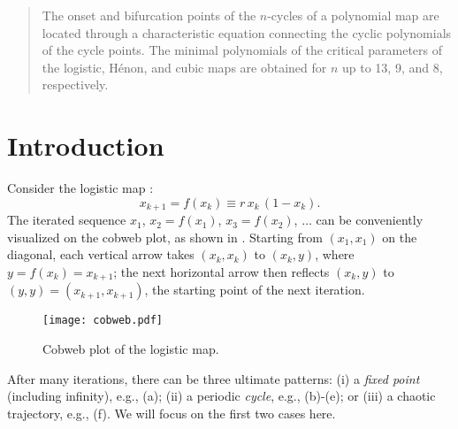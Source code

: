 \documentclass{ws-ijbc}
\begin{document}
\begin{abstract}
The onset and bifurcation points of the $n$-cycles of
  a polynomial map are located
  through a characteristic equation
  connecting the cyclic polynomials of the cycle points.
The minimal polynomials of the critical parameters
  of the logistic, H\'enon, and cubic maps are obtained
  for $n$ up to 13, 9, and 8,
  respectively.
\end{abstract}





\twocolumn



%
%
\section{Introduction}
%
%

Consider the logistic map \cite{may, strogatz}:
%
\begin{equation}
  x_{k+1} = f(x_k) \equiv r \, x_k \, ( 1 - x_k ).
\label{eq:logmap}
\end{equation}
%
The iterated sequence $x_1$,
  $x_2 = f(x_1)$,
  $x_3 = f(x_2)$, $\ldots$
can be conveniently visualized on the cobweb plot,
  as shown in .
%
Starting from $(x_1, x_1)$ on the diagonal,
  each vertical arrow takes $(x_k, x_k)$ to $(x_k, y)$,
  where $y = f(x_k) = x_{k+1}$;
the next horizontal arrow then reflects $(x_k, y)$ to
  $(y, y) = (x_{k+1}, x_{k+1})$,
  the starting point of the next iteration.
%
%
\begin{figure}[h]
  \begin{center}
  \begin{minipage}{\linewidth}
        \texttt{[image: cobweb.pdf]}
  \end{minipage}%
  \end{center}
  \caption{\label{fig:cobweb}
  Cobweb plot of the logistic map.}
\end{figure}
%
%
After many iterations, there can be three ultimate patterns:
  (i) a \emph{fixed point} (including infinity),
      e.g., (a);
  (ii) a periodic \emph{cycle},
      e.g., (b)-(e);
or
  (iii) a chaotic trajectory,
      e.g., (f).
We will focus on the first two cases here.
\end{document}

